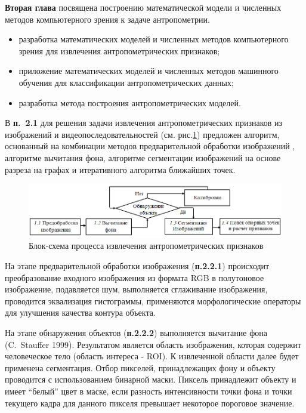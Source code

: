 \textbf{Вторая глава} посвящена построению математической модели и численных методов компьютерного зрения к задаче антропометрии. 
\begin{itemize}
	\item разработка математических моделей и численных методов компьютерного зрения для извлечения антропометрических признаков;
	\item приложение математических моделей и численных методов машинного обучения для классификации антропометрических данных;
	\item разработка метода построения антропометрических моделей.
\end{itemize}

В \textbf{п.~2.1} для решения задачи извлечения антропометрических признаков из изображений и видеопоследовательностей (см. рис.\ref{img53}) предложен алгоритм, основанный на комбинации  методов предварительной обработки изображений , алгоритме вычитания фона, алгоритме сегментации изображений на основе разреза на графах и итеративного алгоритма ближайших точек.
\begin{figure}[ht!]
\centering
\includegraphics [width=1\linewidth] {images/h53.png}
\begin{center}
\caption{Блок-схема процесса извлечения антропометрических признаков } \label{img53}
\end{center}
\end{figure}

На этапе предварительной обработки изображения (\textbf{п.2.2.1}) происходит преобразование входного изображения из формата RGB в полутоновое изображение, подавляется шум, выполняется сглаживание изображения, проводится эквализация гистограммы, применяются морфологические операторы для улучшения качества контура объекта.

На этапе обнаружения объектов (\textbf{п.2.2.2}) выполняется вычитание фона (C.~Stauffer 1999). Результатом является область изображения, которая содержит человеческое тело (область интереса - ROI). К извлеченной области далее будет применена сегментация. Отбор пикселей, принадлежащих фону и объекту проводится с использованием бинарной маски. Пиксель принадлежит объекту и имеет ``белый'' цвет в маске, если разность интенсивности точки фона и точки текущего кадра для данного пикселя превышает некоторое пороговое значение.


